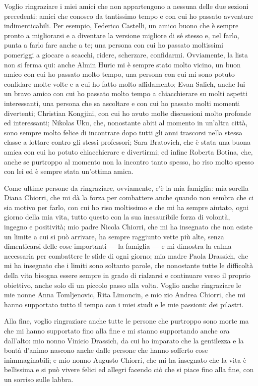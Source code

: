 \documentclass[12pt]{book}
\begin{document}
Voglio ringraziare i miei amici che non appartengono a nessuna delle due sezioni precedenti: amici che conosco da tantissimo tempo e con cui ho passato avventure indimenticabili. Per esempio, Federico Castelli, un amico buono che è sempre pronto a migliorarsi e a diventare la versione migliore di sé stesso e, nel farlo, punta a farlo fare anche a te; una persona con cui ho passato moltissimi pomeriggi a giocare a scacchi, ridere, scherzare, confidarmi.
Ovviamente, la lista non si ferma qui: anche Almin Huric mi è sempre stato molto vicino, un buon amico con cui ho passato molto tempo, una persona con cui mi sono potuto confidare molte volte e a cui ho fatto molto affidamento; Evan Salich, anche lui un bravo amico con cui ho passato molto tempo a chiacchierare su molti aspetti interessanti, una persona che sa ascoltare e con cui ho passato molti momenti divertenti; Christian Kongjini, con cui ho avuto molte discussioni molto profonde ed interessanti; Nikolas Uku, che, nonostante abiti al momento in un’altra città, sono sempre molto felice di incontrare dopo tutti gli anni trascorsi nella stessa classe a lottare contro gli stessi professori; Sara Bratovich, che è stata una buona amica con cui ho potuto chiacchierare e divertirmi; ed infine Roberta Botina, che, anche se purtroppo al momento non la incontro tanto spesso, ho riso molto spesso con lei ed è sempre stata un’ottima amica.

Come ultime persone da ringraziare, ovviamente, c’è la mia famiglia: mia sorella Diana Chiorri, che mi dà la forza per combattere anche quando non sembra che ci sia motivo per farlo, con cui ho riso moltissimo e che mi ha sempre aiutato, ogni giorno della mia vita, tutto questo con la sua inesauribile forza di volontà, ingegno e positività; mio padre Nicola Chiorri, che mi ha insegnato che non esiste un limite a cui si può arrivare, ha sempre raggiunto vette più alte, senza dimenticarsi delle cose importanti — la famiglia — e mi dimostra la calma necessaria per combattere le sfide di ogni giorno; mia madre Paola Drassich, che mi ha insegnato che i limiti sono soltanto parole, che nonostante tutte le difficoltà della vita bisogna essere sempre in grado di rialzarsi e continuare verso il proprio obiettivo, anche solo di un piccolo passo alla volta.
Voglio anche ringraziare le mie nonne Anna Tomljenovic, Rita Limoncin, e mio zio Andrea Chiorri, che mi hanno supportato tutto il tempo con i miei studi e le mie passioni: dei pilastri.

Alla fine, voglio ringraziare anche tutte le persone che purtroppo sono morte ma che mi hanno supportato fino alla fine e mi stanno supportando anche ora dall’alto: mio nonno Vinicio Drassich, da cui ho imparato che la gentilezza e la bontà d’animo nascono anche dalle persone che hanno sofferto cose inimmaginabili; e mio nonno Augusto Chiorri, che mi ha insegnato che la vita è bellissima e si può vivere felici ed allegri facendo ciò che si piace fino alla fine, con un sorriso sulle labbra.
\end{document}
